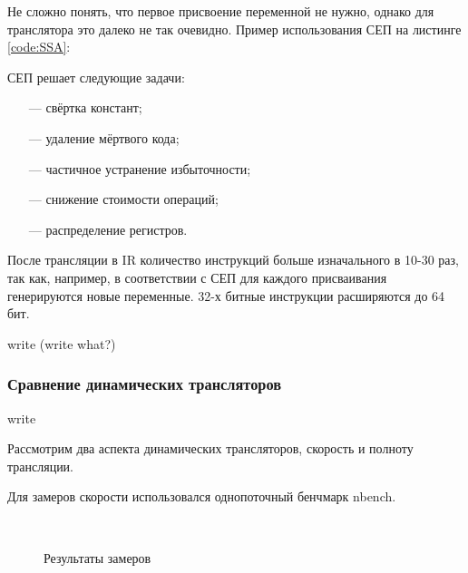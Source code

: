 Не сложно понять, что первое присвоение переменной не нужно, однако для транслятора это далеко не так очевидно. Пример использования СЕП на листинге \ref{code:SSA}:


СЕП решает следующие задачи:
\begin{itemize}[leftmargin=1.6\parindent]
	\item[---] свёртка констант;
	\item[---] удаление мёртвого кода;
	\item[---] частичное устранение избыточности;
	\item[---] снижение стоимости операций;
	\item[---] распределение регистров.
\end{itemize}

После трансляции в IR количество инструкций больше изначального в 10-30 раз, так как, например, в соответствии с СЕП для каждого присваивания генерируются новые переменные. 32-х битные инструкции расширяются до 64 бит.

write (write what?)

\subsubsection{Сравнение динамических трансляторов}

write

Рассмотрим два аспекта динамических трансляторов, скорость и полноту трансляции.

Для замеров скорости использовался однопоточный бенчмарк nbench.

\begin{figure}[hbtp]
	\centering
	\\
	\caption{Результаты замеров}
	\label{fig:speed}
\end{figure}

